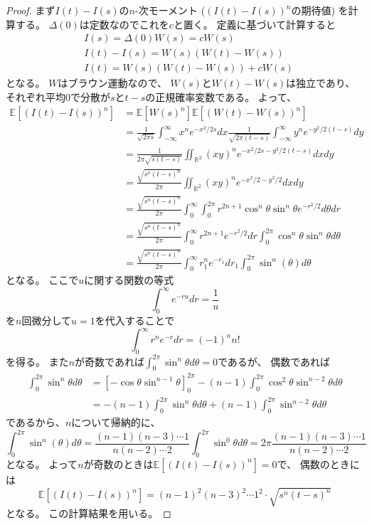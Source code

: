 \documentclass[uplatex]{jsarticle}
\theoremstyle{definition}
\def\R{\mathbb{R}}
\def\E{\mathbb{E}}
\begin{document}
\begin{proof}
  まず\(I(t)-I(s)\)の\(n\)-次モーメント
  (\((I(t)-I(s))^n\)の期待値)
  を計算する。
  \(\Delta(0)\)は定数なのでこれを\(c\)と置く。
  定義に基づいて計算すると
  \begin{align*}
    &I(s) = \Delta(0) W(s) = cW(s) \\
    &I(t) - I(s) = W(s)\left( W(t)-W(s) \right) \\
    &I(t) = W(s)\left( W(t)-W(s) \right) + c W(s)
  \end{align*}
  となる。
  \(W\)はブラウン運動なので、
  \(W(s)\)と\(W(t)-W(s)\)は独立であり、
  それぞれ平均\(0\)で分散が\(s\)と\(t-s\)の正規確率変数である。
  よって、
  \begin{align*}
    \E[(I(t)-I(s))^n]
    &= \E[W(s)^n] \E[(W(t)-W(s))^n] \\
    &= \frac{1}{\sqrt{2\pi s}}\int_{-\infty}^\infty x^ne^{-x^2/2s}dx
    \frac{1}{\sqrt{2\pi(t-s)}}\int_{-\infty}^\infty y^ne^{-y^2/2(t-s)}dy \\
    &= \frac{1}{2\pi \sqrt{s(t-s)}}\iint_{\R^2}
    (xy)^ne^{-x^2/2s-y^2/2(t-s)}dxdy \\
    &= \frac{\sqrt{s^n(t-s)^n}}{2\pi}\iint_{\R^2}
    (xy)^ne^{-x^2/2-y^2/2}dxdy \\
    &= \frac{\sqrt{s^n(t-s)^n}}{2\pi}\int_0^\infty\int_0^{2\pi}
    r^{2n+1}\cos^n\theta \sin^n\theta e^{-r^2/2}d\theta dr \\
    &= \frac{\sqrt{s^n(t-s)^n}}{2\pi}
    \int_0^\infty r^{2n+1}e^{-r^2/2}dr
    \int_0^{2\pi}\cos^n\theta \sin^n\theta d\theta \\
    &= \frac{\sqrt{s^n(t-s)^n}}{2\pi}
    \int_0^\infty r_1^ne^{-r_1}dr_1
    \int_0^{2\pi}\sin^n(\theta) d\theta
  \end{align*}
  となる。
  ここで\(u\)に関する関数の等式
  \[
  \int_0^\infty e^{-ru}dr = \frac{1}{u}
  \]
  を\(n\)回微分して\(u=1\)を代入することで
  \[
  \int_0^\infty r^ne^{-r}dr = (-1)^n n!
  \]
  を得る。
  また\(n\)が奇数であれば\(\int_0^{2\pi}\sin^n\theta d\theta = 0\)であるが、
  偶数であれば
  \begin{align*}
    \int_0^{2\pi}\sin^n\theta d\theta
    &= [-\cos \theta \sin^{n-1}\theta]_0^{2\pi}
    - (n-1)\int_0^{2\pi}\cos^2\theta \sin^{n-2}\theta d\theta \\
    &= -(n-1) \int_0^{2\pi}\sin^n\theta d\theta
    + (n-1) \int_0^{2\pi}\sin^{n-2}\theta d\theta
  \end{align*}
  であるから、\(n\)について帰納的に、
  \[
  \int_0^{2\pi}\sin^n(\theta) d\theta
  = \frac{(n-1)(n-3)\cdots 1}{n(n-2)\cdots 2}
  \int_0^{2\pi}\sin^0\theta d\theta
  = 2\pi \frac{(n-1)(n-3)\cdots 1}{n(n-2)\cdots 2}
  \]
  となる。
  よって\(n\)が奇数のときは\(\E[(I(t)-I(s))^n] = 0\)で、
  偶数のときには
  \[
  \E[(I(t)-I(s))^n] = (n-1)^2(n-3)^2\cdots 1^2\cdot \sqrt{s^n(t-s)^n}
  \]
  となる。
  この計算結果を用いる。


\end{proof}
\end{document}
